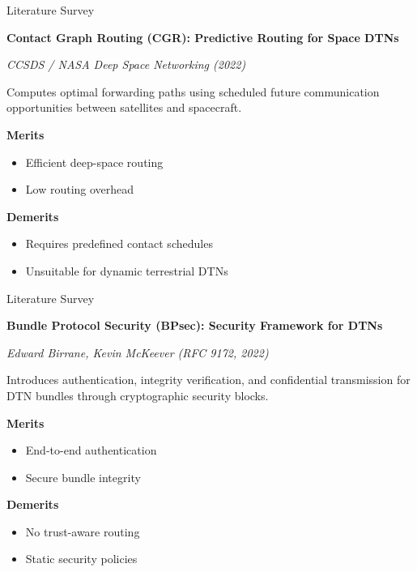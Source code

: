 \documentclass[11pt,aspectratio=43]{beamer}
\begin{document}
\begin{frame}{Literature Survey}

\textbf{Contact Graph Routing (CGR): Predictive Routing for Space DTNs}

\textit{CCSDS / NASA Deep Space Networking (2022)}

\vspace{0.2cm}

Computes optimal forwarding paths using scheduled future communication opportunities between satellites and spacecraft.

\vspace{0.2cm}

\textbf{Merits}
\begin{itemize}
    \item Efficient deep-space routing
    \item Low routing overhead
\end{itemize}

\textbf{Demerits}
\begin{itemize}
    \item Requires predefined contact schedules
    \item Unsuitable for dynamic terrestrial DTNs
\end{itemize}

\end{frame}
\begin{frame}{Literature Survey}

\textbf{Bundle Protocol Security (BPsec): Security Framework for DTNs}

\textit{Edward Birrane, Kevin McKeever (RFC 9172, 2022)}

\vspace{0.2cm}

Introduces authentication, integrity verification, and confidential transmission for DTN bundles through cryptographic security blocks.

\vspace{0.2cm}

\textbf{Merits}
\begin{itemize}
    \item End-to-end authentication
    \item Secure bundle integrity
\end{itemize}

\textbf{Demerits}
\begin{itemize}
    \item No trust-aware routing
    \item Static security policies
\end{itemize}

\end{frame}
\end{document}
